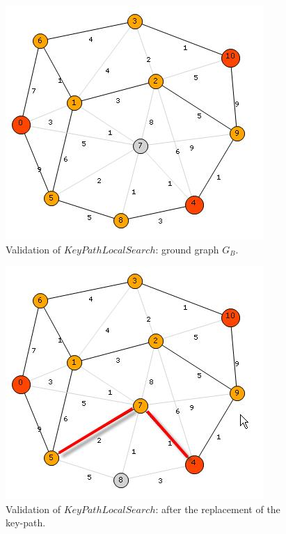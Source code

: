 \begin{figure}[H]
\begin{center}
\includegraphics[scale=0.8]{25.jpg}
\caption{Validation of $KeyPathLocalSearch$: ground graph $G_B$.}\label{fig:25}
\end{center} 
\end{figure}

\begin{figure}[H]
\begin{center}
\includegraphics[scale=0.8]{26.jpg}
\caption{Validation of $KeyPathLocalSearch$: after the replacement of the key-path.}\label{fig:26}
\end{center} 
\end{figure}

